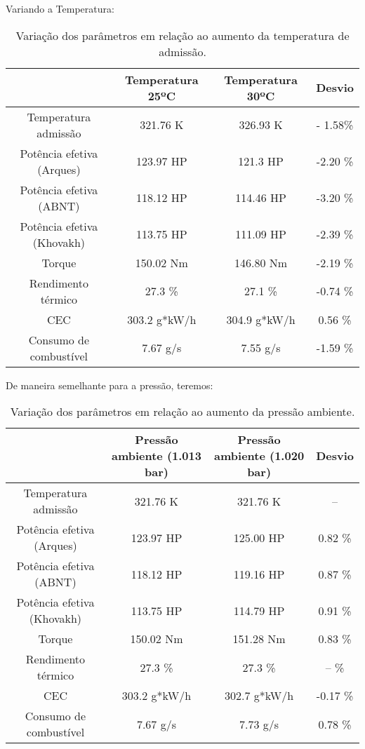 \documentclass[a4paper]{article}
\begin{document}
Variando a Temperatura:

\begin{table}[H]
    \centering
    \begin{tabular}{|c|c|c|c|}
    \hline
    & Temperatura 25ºC & Temperatura 30ºC & Desvio\\
    \hline
    Temperatura admissão & 321.76 K & 326.93 K & - 1.58\%\\
    \hline
    Potência efetiva (Arques) & 123.97 HP & 121.3 HP & -2.20 \%\\
    \hline
    Potência efetiva (ABNT) & 118.12 HP & 114.46 HP & -3.20 \%\\
    \hline
    Potência efetiva (Khovakh) & 113.75 HP & 111.09 HP & -2.39 \%\\
    \hline
    Torque & 150.02 Nm & 146.80 Nm & -2.19 \%\\
    \hline
    Rendimento térmico & 27.3 \% & 27.1 \% & -0.74 \% \\
    \hline
    CEC & 303.2 g*kW/h & 304.9 g*kW/h & 0.56 \%\\
    \hline
    Consumo de combustível & 7.67 g/s & 7.55 g/s & -1.59 \%\\
    \hline
    \end{tabular}
    \caption{Variação dos parâmetros em relação ao aumento da temperatura de admissão.}
\end{table}
De maneira semelhante para a pressão, teremos:

\begin{table}[!htb]
    \centering
    \begin{tabular}{|c|c|c|c|}
    \hline
    & Pressão ambiente (1.013 bar) & Pressão ambiente (1.020 bar) & Desvio\\
    \hline
    Temperatura admissão & 321.76 K & 321.76 K & --\\
    \hline
    Potência efetiva (Arques) & 123.97 HP & 125.00 HP & 0.82 \%\\
    \hline
    Potência efetiva (ABNT) & 118.12 HP & 119.16 HP & 0.87 \%\\
    \hline
    Potência efetiva (Khovakh) & 113.75 HP & 114.79 HP & 0.91 \%\\
    \hline
    Torque & 150.02 Nm & 151.28 Nm & 0.83 \%\\
    \hline
    Rendimento térmico & 27.3 \% & 27.3 \% & -- \% \\
    \hline
    CEC & 303.2 g*kW/h & 302.7 g*kW/h & -0.17 \%\\
    \hline
    Consumo de combustível & 7.67 g/s & 7.73 g/s & 0.78 \%\\
    \hline
    \end{tabular}
    \caption{Variação dos parâmetros em relação ao aumento da pressão ambiente.}
\end{table}
\end{document}
